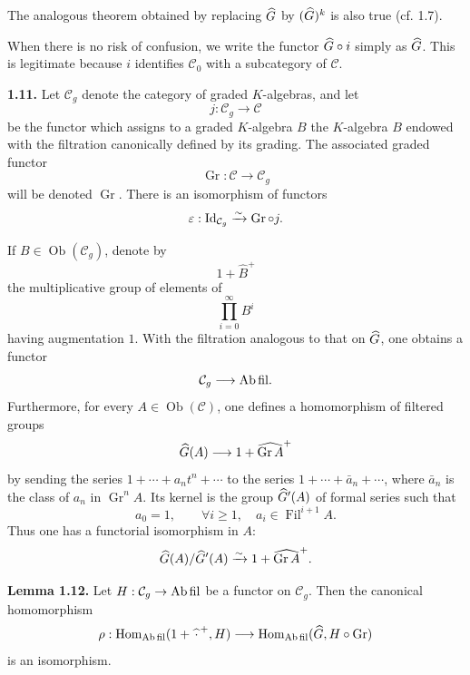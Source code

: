 \documentclass[11pt]{article}
\newcommand{\Fil}{\operatorname{Fil}}
\begin{document}
The analogous theorem obtained by replacing \(\widehat G\) by \((\widehat G)^k\) is also true (cf. 1.7).

When there is no risk of confusion, we write the functor \(\widehat G\circ i\) simply as \(\widehat G\). This is legitimate because \(i\) identifies \(\mathcal C_0\) with a subcategory of \(\mathcal C\).

\textbf{1.11.} Let \(\mathcal C_g\) denote the category of graded \(K\)-algebras, and let
\[
  j:\mathcal C_g\longrightarrow\mathcal C
\]
be the functor which assigns to a graded \(K\)-algebra \(B\) the \(K\)-algebra \(B\) endowed with the filtration canonically defined by its grading. The associated graded functor
\[
  \operatorname{Gr}:\mathcal C\longrightarrow \mathcal C_g
\]
will be denoted \(\operatorname{Gr}\). There is an isomorphism of functors
\[
  \varepsilon:\operatorname{Id}_{\mathcal C_g}\xrightarrow{\sim}\operatorname{Gr}\circ j.
\]

If \(B\in\operatorname{Ob}(\mathcal C_g)\), denote by
\[
  1+\widehat{B}^{+}
\]
the multiplicative group of elements of
\[
  \prod_{i=0}^{\infty}B^i
\]
having augmentation \(1\). With the filtration analogous to that on \(\widehat G\), one obtains a functor
\[
  \mathcal C_g\longrightarrow\mathrm{Ab\,fil}.
\]
Furthermore, for every \(A\in\operatorname{Ob}(\mathcal C)\), one defines a homomorphism of filtered groups
\[
  \widehat G(A)\longrightarrow 1+\widehat{\operatorname{Gr}A}^{+}
\]
by sending the series \(1+\cdots+a_nt^n+\cdots\) to the series \(1+\cdots+\bar a_n+\cdots\), where \(\bar a_n\) is the class of \(a_n\) in \(\operatorname{Gr}^nA\). Its kernel is the group \(\widehat G'(A)\) of formal series such that
\[
  a_0=1,\qquad \forall i\geq 1,\quad a_i\in\Fil^{i+1}A.
\]
Thus one has a functorial isomorphism in \(A\):
\[
  \widehat G(A)/\widehat G'(A)\xrightarrow{\sim} 1+\widehat{\operatorname{Gr}A}^{+}.
\]

\textbf{Lemma 1.12.} Let \(H:\mathcal C_g\to\mathrm{Ab\,fil}\) be a functor on \(\mathcal C_g\). Then the canonical homomorphism
\[
  \rho:\operatorname{Hom}_{\mathrm{Ab\,fil}}(1+\widehat{\,\cdot\,}^{+},H)
  \longrightarrow
  \operatorname{Hom}_{\mathrm{Ab\,fil}}(\widehat G,H\circ\operatorname{Gr})
\]
is an isomorphism.
\end{document}
